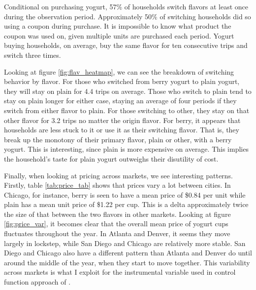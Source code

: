 \documentclass[11pt]{article}
\theoremstyle{definition}
\theoremstyle{remark}
\begin{document}
    Conditional on purchasing yogurt, 57\% of households switch flavors at least once during the observation period. Approximately 50\% of switching households did so using a coupon during purchase. It is impossible to know what product the coupon was used on, given multiple units are purchased each period. Yogurt buying households, on average, buy the same flavor for ten consecutive trips and switch three times. 

    Looking at figure \ref{fig:flav_heatmap}, we can see the breakdown of switching behavior by flavor. For those who switched from berry yogurt to plain yogurt, they will stay on plain for 4.4 trips on average. Those who switch to plain tend to stay on plain longer for either case, staying an average of four periods if they switch from either flavor to plain. For those switching to other, they stay on that other flavor for 3.2 trips no matter the origin flavor. For berry, it appears that households are less stuck to it or use it as their switching flavor. That is, they break up the monotony of their primary flavor, plain or other, with a berry yogurt. This is interesting, since plain is more expensive on average. This implies the household's taste for plain yogurt outweighs their disutility of cost. 

    Finally, when looking at pricing across markets, we see interesting patterns. Firstly, table \ref{tab:price_tab} shows that prices vary a lot between cities. In Chicago, for instance, berry is seen to have a mean price of \$0.84 per unit while plain has a mean unit price of \$1.22 per cup. This is a delta approximately twice the size of that between the two flavors in other markets. Looking at figure \ref{fig:price_var}, it becomes clear that the overall mean price of yogurt cups fluctuates throughout the year. In Atlanta and Denver, it seems they move largely in lockstep, while San Diego and Chicago are relatively more stable. San Diego and Chicago also have a different pattern than Atlanta and Denver do until around the middle of the year, when they start to move together. This variability across markets is what I exploit for the instrumental variable used in control function approach of \citet{petrin_control_2010}.

\end{document}
